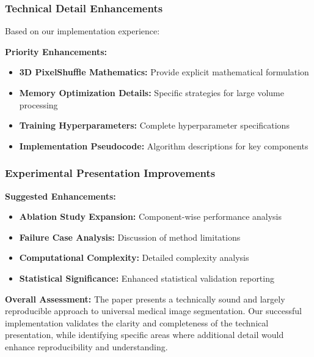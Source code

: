 \subsubsection{Technical Detail Enhancements}
Based on our implementation experience:

\textbf{Priority Enhancements:}
\begin{itemize}
    \item \textbf{3D PixelShuffle Mathematics:} Provide explicit mathematical formulation
    \item \textbf{Memory Optimization Details:} Specific strategies for large volume processing
    \item \textbf{Training Hyperparameters:} Complete hyperparameter specifications
    \item \textbf{Implementation Pseudocode:} Algorithm descriptions for key components
\end{itemize}

\subsubsection{Experimental Presentation Improvements}
\textbf{Suggested Enhancements:}
\begin{itemize}
    \item \textbf{Ablation Study Expansion:} Component-wise performance analysis
    \item \textbf{Failure Case Analysis:} Discussion of method limitations
    \item \textbf{Computational Complexity:} Detailed complexity analysis
    \item \textbf{Statistical Significance:} Enhanced statistical validation reporting
\end{itemize}

\textbf{Overall Assessment:} The paper presents a technically sound and largely reproducible approach to universal medical image segmentation. Our successful implementation validates the clarity and completeness of the technical presentation, while identifying specific areas where additional detail would enhance reproducibility and understanding.
